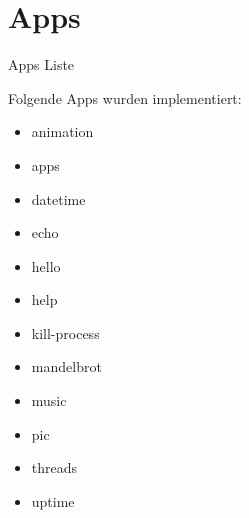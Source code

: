 \section{Apps}



\begin{frame}{Apps Liste}
    \begin{Large}
        Folgende Apps wurden implementiert:
    \end{Large}
    \vspace{15pt}

    \begin{minipage}[t]{0.2\textwidth}
        \begin{itemize}
            \item animation
            \item apps
            \item datetime
            \item echo
            \item hello
            \item help
        \end{itemize}
        
           
    \end{minipage}
    \hfill
    \begin{minipage}[t]{0.48\textwidth}
        \begin{itemize}
            \item kill-process
            \item mandelbrot
            \item music
            \item pic
            \item threads
            \item uptime
        \end{itemize} 
    \end{minipage}


    
    
\end{frame}

